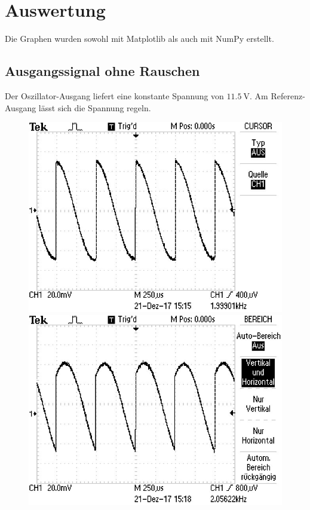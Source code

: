 \section{Auswertung}
\label{sec:Auswertung}

Die Graphen wurden sowohl mit Matplotlib \cite{matplotlib} als auch mit NumPy \cite{numpy} erstellt.

\subsection{Ausgangssignal ohne Rauschen}
\label{sec:oR}

Der Oszillator-Ausgang liefert eine konstante Spannung von $\SI{11,5}{\volt}$.
Am Referenz-Ausgang lässt sich die Spannung regeln.

\begin{figure}
\centering
\begin{minipage}{0.48\textwidth}
\centering
{}
\includegraphics[scale=.75]{content/images/00.jpg}
\end{minipage}
\begin{minipage}{0.48\textwidth}
\centering
{}
\includegraphics[scale=.75]{content/images/45.jpg}
\end{minipage}


\end{figure}
